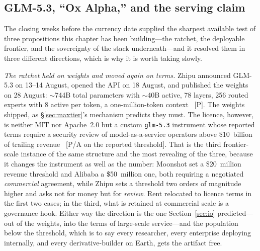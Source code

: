 \subsection{GLM-5.3, ``Ox Alpha,'' and the serving claim}
\label{sec:glm53}

The closing weeks before the currency date supplied the sharpest available test of three propositions this chapter has been building---the ratchet, the deployable frontier, and the sovereignty of the stack underneath---and it resolved them in three different directions, which is why it is worth taking slowly.

\emph{The ratchet held on weights and moved again on terms.} Zhipu announced GLM-5.3 on 13--14 August, opened the API on 18 August, and published the weights on 28 August: $\sim$744B total parameters with $\sim$40B active, 78 layers, 256 routed experts with 8 active per token, a one-million-token context~\cite{glm53} [P]. The weights shipped, as \S\ref{sec:maxtier}'s mechanism predicts they must. The licence, however, is neither MIT nor Apache~2.0 but a custom \texttt{glm-5.3} instrument whose reported terms require a security review of model-as-a-service operators above \$10~billion of trailing revenue~\cite{glm53} [P/A on the reported threshold]. That is the third frontier-scale instance of the same structure and the most revealing of the three, because it changes the instrument as well as the number: Moonshot set a \$20~million revenue threshold and Alibaba a \$50~million one, both requiring a negotiated \emph{commercial} agreement, while Zhipu sets a threshold two orders of magnitude higher and asks not for money but for \emph{review}. Rent relocated to licence terms in the first two cases; in the third, what is retained at commercial scale is a governance hook. Either way the direction is the one Section~\ref{sec:io} predicted---out of the weights, into the terms of large-scale service---and the population below the threshold, which is to say every researcher, every enterprise deploying internally, and every derivative-builder on Earth, gets the artifact free.

